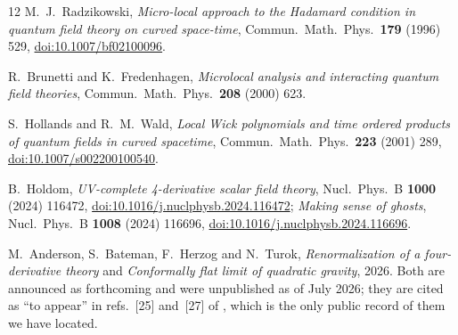 \documentclass[11pt]{article}
\theoremstyle{definition}
\theoremstyle{remark}
\begin{document}
\begin{thebibliography}{12}
M.~J.~Radzikowski,
\emph{Micro-local approach to the Hadamard condition in quantum field
theory on curved space-time},
Commun.\ Math.\ Phys.\ \textbf{179} (1996) 529,
\href{https://doi.org/10.1007/bf02100096}{doi:10.1007/bf02100096}.

R.~Brunetti and K.~Fredenhagen,
\emph{Microlocal analysis and interacting quantum field theories},
Commun.\ Math.\ Phys.\ \textbf{208} (2000) 623.

S.~Hollands and R.~M.~Wald,
\emph{Local Wick polynomials and time ordered products of quantum fields
in curved spacetime},
Commun.\ Math.\ Phys.\ \textbf{223} (2001) 289,
\href{https://doi.org/10.1007/s002200100540}{doi:10.1007/s002200100540}.

B.~Holdom,
\emph{UV-complete 4-derivative scalar field theory},
Nucl.\ Phys.\ B \textbf{1000} (2024) 116472,
\href{https://doi.org/10.1016/j.nuclphysb.2024.116472}
{doi:10.1016/j.nuclphysb.2024.116472};
\emph{Making sense of ghosts},
Nucl.\ Phys.\ B \textbf{1008} (2024) 116696,
\href{https://doi.org/10.1016/j.nuclphysb.2024.116696}
{doi:10.1016/j.nuclphysb.2024.116696}.

M.~Anderson, S.~Bateman, F.~Herzog and N.~Turok,
\emph{Renormalization of a four-derivative theory} and
\emph{Conformally flat limit of quadratic gravity}, 2026.
Both are announced as forthcoming and were unpublished as of July 2026; they
are cited as ``to appear'' in refs.~[25] and~[27] of \cite{BT2026}, which is
the only public record of them we have located.

\end{thebibliography}
\end{document}
